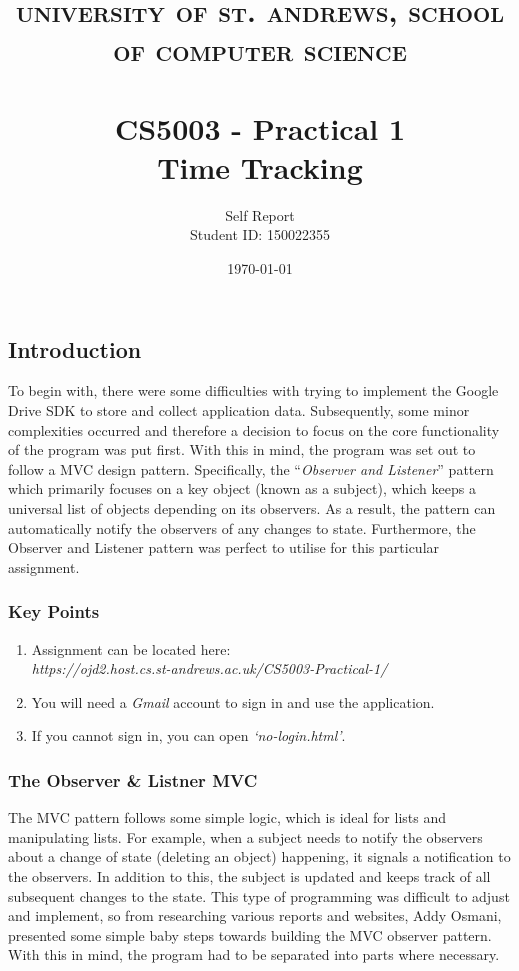 \documentclass[paper=a4, fontsize=10pt]{article}
\title{	
\normalfont \small
\textsc{university of st. andrews, school of computer science} \\ [0pt] %
\horrule{0.5pt} \\[0cm] %
\Large \bf CS5003 - Practical 1  \\ Time Tracking
\horrule{0.5pt} \\[0cm]
}
\author{Self Report \\ Student ID: 150022355} %
\date{\normalsize\today} %
\begin{document}
\maketitle %


\subsection*{Introduction}
To begin with, there were some difficulties with trying to implement the Google Drive SDK to store and collect application data. Subsequently, some minor complexities occurred and therefore a decision to focus on the core functionality of the program was put first. With this in mind, the program was set out to follow a MVC design pattern. Specifically, the ``\textit{Observer and Listener}'' pattern which primarily focuses on a key object (known as a subject), which keeps a universal list of objects depending on its observers. As a result, the pattern can automatically notify the observers of any changes to state. Furthermore, the Observer and Listener pattern was perfect to utilise for this particular assignment. 
\subsubsection*{Key Points}
\begin{enumerate}
\item Assignment can be located here: \\ \textit{https://ojd2.host.cs.st-andrews.ac.uk/CS5003-Practical-1/}
\item You will need a \textit{Gmail} account to sign in and use the application. 
\item If you cannot sign in, you can open \textit{`no-login.html'}. 
\end{enumerate}
\subsubsection*{The Observer \& Listner MVC}
The MVC pattern follows some simple logic, which is ideal for lists and manipulating lists. For example, when a subject needs to notify the observers about a change of state (deleting an object) happening, it signals a notification to the observers. In addition  to this, the subject is updated and keeps track of all subsequent changes to the state. This type of programming was difficult to adjust and implement, so from researching various reports and websites, Addy Osmani, presented some simple baby steps towards building the MVC observer pattern. With this in mind, the program had to be separated into parts where necessary.
\clearpage
\end{document}
